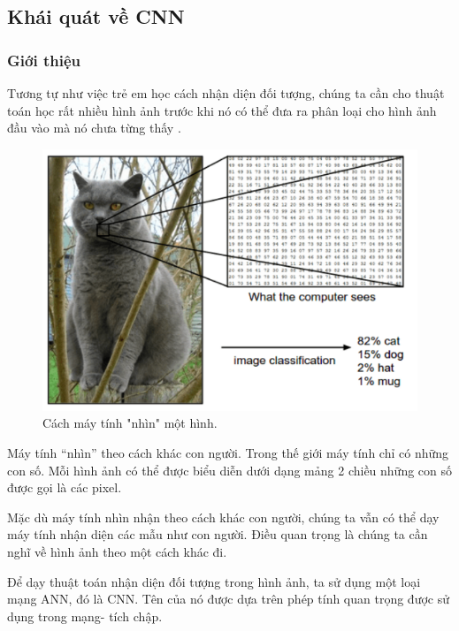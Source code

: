 \setcounter{chapter}{0}
\setcounter{section}{0}
\begin{center}
\chapter{\tenchuongi}
\end{center}

\section{Khái quát về CNN}
\subsection{Giới thiệu}
Tương tự như việc trẻ em học cách nhận diện đối tượng, chúng ta cần cho thuật toán học rất nhiều hình ảnh trước khi nó có thể đưa ra phân loại cho hình ảnh đầu vào mà nó chưa từng thấy \cite{ntt}.

\begin{figure}[H]
	\centering
	\includegraphics[width=0.7\linewidth]{images/how_computer_see_image}
	\caption[Cách máy tính "nhìn" một hình.]{Cách máy tính "nhìn" một hình.}
\end{figure}

Máy tính “nhìn” theo cách khác con người. Trong thế giới máy tính chỉ có những con số. Mỗi hình ảnh có thể được biểu diễn dưới dạng mảng 2 chiều những con số được gọi là các pixel.

Mặc dù máy tính nhìn nhận theo cách khác con người, chúng ta vẫn có thể dạy máy tính nhận diện các mẫu như con người. Điều quan trọng là chúng ta cần nghĩ về hình ảnh theo một cách khác đi.

Để dạy thuật toán nhận diện đối tượng trong hình ảnh, ta sử dụng một loại mạng ANN, đó là CNN. Tên của nó được dựa trên phép tính quan trọng được sử dụng trong mạng- tích chập.

